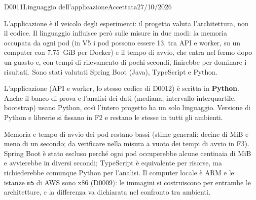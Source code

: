 \begin{decisione}{D0011}{Linguaggio dell'applicazione}{Accettata}{27/10/2026}

\contesto
L'applicazione è il veicolo degli esperimenti: il progetto valuta l'architettura, non il codice. Il linguaggio influisce però sulle misure in due modi: la memoria occupata da ogni pod (in V5 i pod possono essere 13, tra API e worker, su un computer con 7,75~GiB per Docker) e il tempo di avvio, che entra nel fermo dopo un guasto e, con tempi di rilevamento di pochi secondi, finirebbe per dominare i risultati. Sono stati valutati Spring Boot (Java), TypeScript e Python.

\scelta
L'applicazione (API e worker, lo stesso codice di D0012) è scritta in \textbf{Python}. Anche il banco di prova e l'analisi dei dati (mediana, intervallo interquartile, bootstrap) usano Python, così l'intero progetto ha un solo linguaggio. Versione di Python e librerie si fissano in F2 e restano le stesse in tutti gli ambienti.

\conseguenze
Memoria e tempo di avvio dei pod restano bassi (stime generali: decine di MiB e meno di un secondo; da verificare nella misura a vuoto dei tempi di avvio in F3). Spring Boot è stato escluso perché ogni pod occuperebbe alcune centinaia di MiB e avvierebbe in diversi secondi; TypeScript è equivalente per risorse, ma richiederebbe comunque Python per l'analisi. Il computer locale è ARM e le istanze \texttt{m5} di AWS sono x86 (D0009): le immagini si costruiscono per entrambe le architetture, e la differenza va dichiarata nel confronto tra ambienti.

\end{decisione}
